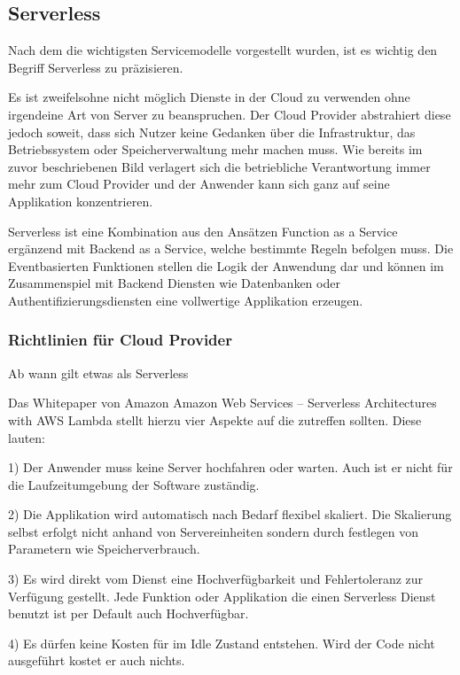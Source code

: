 \subsection{Serverless}

Nach dem die wichtigsten Servicemodelle vorgestellt wurden, ist es wichtig den Begriff Serverless
zu präzisieren.


Es ist zweifelsohne nicht möglich Dienste in der Cloud zu verwenden ohne irgendeine Art von Server zu beanspruchen.
Der Cloud Provider abstrahiert diese jedoch soweit, dass sich Nutzer keine Gedanken über
die Infrastruktur, das Betriebssystem oder Speicherverwaltung mehr machen muss.
Wie bereits im zuvor beschriebenen Bild verlagert sich die betriebliche Verantwortung immer mehr zum
Cloud Provider und der Anwender kann sich ganz auf seine Applikation konzentrieren.

Serverless ist eine Kombination aus den Ansätzen Function as a Service ergänzend mit Backend as a Service,
welche bestimmte Regeln befolgen muss.
Die Eventbasierten Funktionen stellen die Logik der Anwendung dar und können im Zusammenspiel mit
Backend Diensten wie Datenbanken oder Authentifizierungsdiensten eine vollwertige Applikation erzeugen.



\subsubsection{Richtlinien für Cloud Provider }

Ab wann gilt etwas als Serverless

Das Whitepaper von Amazon \flqq Amazon Web Services – Serverless Architectures with AWS Lambda\frqq
stellt hierzu vier Aspekte auf die zutreffen sollten. Diese lauten:

1) Der Anwender muss keine Server hochfahren oder warten. Auch ist er nicht für die Laufzeitumgebung der Software
zuständig.

2) Die Applikation wird automatisch nach Bedarf flexibel skaliert. Die Skalierung selbst erfolgt nicht anhand von Servereinheiten
sondern durch festlegen von Parametern wie Speicherverbrauch.

3) Es wird direkt vom Dienst eine Hochverfügbarkeit und Fehlertoleranz zur Verfügung gestellt. Jede Funktion oder Applikation die
einen Serverless Dienst benutzt ist per Default auch Hochverfügbar.

4) Es dürfen keine Kosten für im Idle Zustand entstehen. Wird der Code nicht ausgeführt kostet er auch nichts.
\cite[]{AWSWhitepaper}



